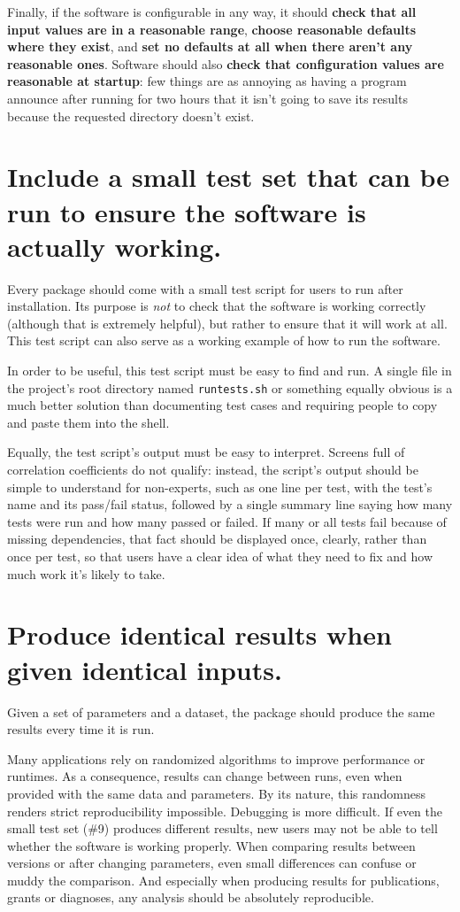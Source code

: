\documentclass[10pt,letterpaper]{article}
\begin{document}
Finally,
if the software is configurable in any way,
it should \textbf{check that all input values are in a reasonable range},
\textbf{choose reasonable defaults where they exist},
and \textbf{set no defaults at all when there aren't any reasonable ones}.
Software should also \textbf{check that configuration values are reasonable at startup}:
few things are as annoying as having a program announce after running for two hours
that it isn't going to save its results
because the requested directory doesn't exist.

\section{Include a small test set that can be run to ensure the software is actually working.}

Every package should come with a small test script for users to run
after installation. Its purpose is \emph{not} to check that the software
is working correctly (although that is extremely helpful), but rather to
ensure that it will work at all. This test script can also serve as a
working example of how to run the software.

In order to be useful, this test script must be easy to find and run. A
single file in the project's root directory named \texttt{runtests.sh}
or something equally obvious is a much better solution than documenting
test cases and requiring people to copy and paste them into the shell.

Equally, the test script's output must be easy to interpret. Screens
full of correlation coefficients do not qualify: instead, the script's
output should be simple to understand for non-experts,
such as one line per test, with the test's name
and its pass/fail status, followed by a single summary line saying how
many tests were run and how many passed or failed. If many or all tests
fail because of missing dependencies, that fact should be displayed
once, clearly, rather than once per test, so that users have a clear
idea of what they need to fix and how much work it's likely to take.

\section{Produce identical results when given identical inputs.}

Given a set of parameters and a dataset, the package should produce the
same results every time it is run.

Many applications rely on randomized algorithms to
improve performance or runtimes. As a consequence, results can change
between runs, even when provided with the same data and parameters. By
its nature, this randomness renders strict reproducibility impossible.
Debugging is more difficult. If even the small test set (\#9) produces
different results, new users may not be able to tell whether the software is
working properly. When comparing
results between versions or after changing parameters, even small
differences can confuse or muddy the comparison. And especially when
producing results for publications, grants or diagnoses, any analysis
should be absolutely reproducible.
\end{document}
